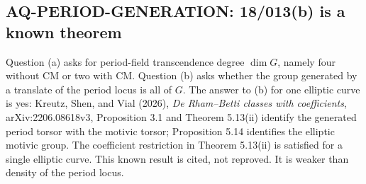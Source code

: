 \subsection{AQ-PERIOD-GENERATION: 18/013(b) is a known theorem}
Question (a) asks for period-field transcendence degree
$\dim G$, namely four without CM or two with CM.
Question (b) asks whether the group generated by a
translate of the period locus is all of $G$.
The answer to (b) for one elliptic curve is yes:
Kreutz, Shen, and Vial (2026), \emph{De Rham--Betti classes
with coefficients}, arXiv:2206.08618v3, Proposition 3.1
and Theorem 5.13(ii) identify the generated period torsor
with the motivic torsor; Proposition 5.14 identifies
the elliptic motivic group. The coefficient restriction
in Theorem 5.13(ii) is satisfied for a single elliptic
curve. This known result is cited, not reproved.
It is weaker than density of the period locus.

